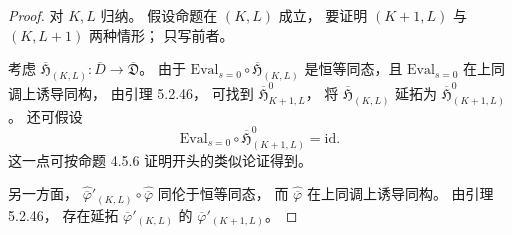 \begin{proof}
对 $K,L$ 归纳。
假设命题在 $(K,L)$ 成立，
要证明 $(K+1,L)$ 与
$(K,L+1)$ 两种情形；
只写前者。

考虑
$\overline{\mathfrak H}_{(K,L)}:
\overline D\to\overline{\mathfrak D}$。
由于
$\mathrm{Eval}_{s=0}
\circ\overline{\mathfrak H}_{(K,L)}$
是恒等同态，且
$\mathrm{Eval}_{s=0}$
在上同调上诱导同构，
由引理 5.2.46，
可找到
$\overline{\mathfrak H}^{0}_{K+1,L}$，
将
$\overline{\mathfrak H}_{(K,L)}$
延拓为
$\overline{\mathfrak H}^{0}_{(K+1,L)}$。
还可假设
\[
\mathrm{Eval}_{s=0}
\circ\overline{\mathfrak H}^{0}_{(K+1,L)}
=\mathrm{id}.
\]
这一点可按命题 4.5.6
证明开头的类似论证得到。

另一方面，
$\widehat{\overline\varphi}'_{(K,L)}
\circ\widehat{\overline\varphi}$
同伦于恒等同态，
而 $\widehat{\overline\varphi}$
在上同调上诱导同构。
由引理 5.2.46，
存在延拓
$\overline\varphi'_{(K,L)}$
的
$\overline\varphi'_{(K+1,L)}$。


\end{proof}
